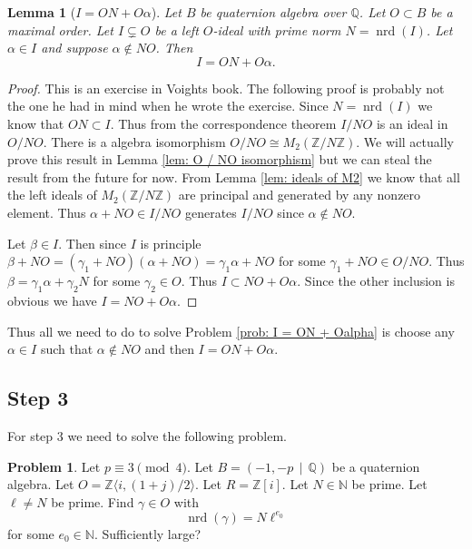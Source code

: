 \documentclass[10pt]{article}
\theoremstyle{plain}
\newtheorem{lemma}[theorem]{Lemma}
\theoremstyle{definition}
\newtheorem{prob}[theorem]{Problem}
\newcommand{\iso}{\cong}
\newcommand{\op}{\operatorname}
\newcommand{\N}{\mathbb{N}}
\newcommand{\Z}{\mathbb{Z}}
\newcommand{\Q}{\mathbb{Q}}
\newcommand{\nrd}{\op{nrd}}
\begin{document}
\begin{lemma}[\( I = ON + O\alpha \)]
    Let \( B \) be quaternion algebra over \( \Q \).
    Let \( O \subset B \) be a maximal order.
    Let \( I \subsetneq O \) be a left \( O \)-ideal with prime norm \( N = \nrd(I) \).
    Let \( \alpha \in I \) and suppose \( \alpha \not\in NO \).
    Then
    \[
        I = ON + O \alpha .
    \]
\end{lemma}
\begin{proof}
    {\color{red} This is an exercise in Voights book. The following proof is probably not the one he had in mind when he wrote the exercise.}
    Since \( N = \nrd(I) \) we know that \( ON \subset I \).
    Thus from the correspondence theorem \( I / NO \) is an ideal in \( O / NO \).
    There is a algebra isomorphism \( O / NO \iso M_2(\Z / N\Z) \).
    We will actually prove this result in Lemma \ref{lem: O / NO isomorphism} but we can steal the result from the future for now.
    From Lemma \ref{lem: ideals of M2} we know that all the left ideals of \( M_2(\Z / N\Z) \) are principal and generated by any nonzero element.
    Thus \(  \alpha + NO \in I / NO \) generates \( I / NO \) since \( \alpha \not\in NO \).

    Let \( \beta \in I \).
    Then since \( I \) is principle \( \beta + NO = (\gamma_1 + NO)(\alpha + NO) = \gamma_1\alpha + NO\) for some \( \gamma_1 + NO \in O / NO \).
    Thus \( \beta = \gamma_1\alpha + \gamma_2N \) for some \( \gamma_2 \in O \).
    Thus \( I \subset NO + O\alpha \).
    Since the other inclusion is obvious we have \( I =  NO + O\alpha \).
\end{proof}

Thus all we need to do to solve Problem \ref{prob: I = ON + Oalpha} is choose any \( \alpha \in I \) such that \( \alpha \not \in NO \) and then \( I = ON + O \alpha \).

\subsection{Step 3}
For step 3 we need to solve the following problem.

\begin{prob}
    Let \( p \equiv 3 \pmod{4} \).
    Let \( B =  (-1, -p \, \mid \, \Q) \) be a quaternion algebra.
    Let \( O = \Z \langle i, (1+j) / 2 \rangle \).
    Let \( R = \Z[i] \).
    Let \( N \in \N \) be prime.
    Let \( \ell \neq N \) be prime.
    Find \( \gamma \in O \) with
    \[
        \nrd(\gamma) = N\ell^{e_0}
    \]
    for some \( e_0 \in \N \). {\color{red} Sufficiently large?}
\end{prob}
\end{document}
